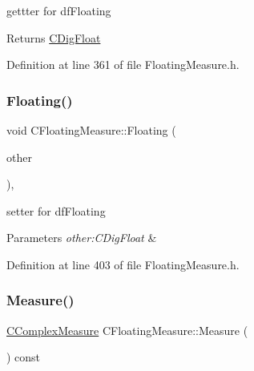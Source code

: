 gettter for df\+Floating 

\begin{DoxyReturn}{Returns}
\hyperlink{classCDigFloat}{C\+Dig\+Float} 
\end{DoxyReturn}


Definition at line 361 of file Floating\+Measure.\+h.

\mbox{\label{classCFloatingMeasure_aa33fe952e9c01f5f76cef5e6f0d03864}} 
\subsubsection{\texorpdfstring{Floating()}{Floating()}\hspace{0.1cm}{\footnotesize\ttfamily [2/2]}}
{\footnotesize\ttfamily void C\+Floating\+Measure\+::\+Floating (\begin{DoxyParamCaption}\item[{const \hyperlink{classCDigFloat}{C\+Dig\+Float} \&}]{other }\end{DoxyParamCaption})\hspace{0.3cm}{\ttfamily [inline]}, {\ttfamily [protected]}}



setter for df\+Floating 


\begin{DoxyParams}{Parameters}
{\em other\+:\+C\+Dig\+Float} & \\
\hline
\end{DoxyParams}


Definition at line 403 of file Floating\+Measure.\+h.

\mbox{\label{classCFloatingMeasure_a8ac3af95a2619670a51d744c85b44463}} 
\subsubsection{\texorpdfstring{Measure()}{Measure()}\hspace{0.1cm}{\footnotesize\ttfamily [1/2]}}
{\footnotesize\ttfamily \hyperlink{classCComplexMeasure}{C\+Complex\+Measure} C\+Floating\+Measure\+::\+Measure (\begin{DoxyParamCaption}{ }\end{DoxyParamCaption}) const\hspace{0.3cm}{\ttfamily [inline]}}



